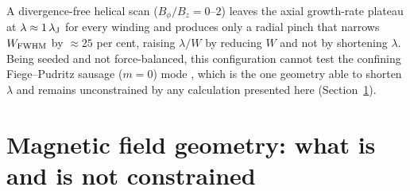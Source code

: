 \documentclass[usenatbib,twoside,twocolumn]{mnras}
\begin{document}
A divergence-free helical scan ($B_\phi/B_z=0$--$2$) leaves the axial growth-rate plateau at $\lambda\approx1\,\lambda_{\rm J}$ for every winding and produces only a radial pinch that narrows $W_{\rm FWHM}$ by $\approx25$ per cent, raising $\lambda/W$ by reducing $W$ and not by shortening $\lambda$. Being seeded and not force-balanced, this configuration cannot test the confining Fiege--Pudritz sausage ($m=0$) mode \citep{Fiege2000}, which is the one geometry able to shorten $\lambda$ and remains unconstrained by any calculation presented here (Section~\ref{sec:fields}).


\section{Magnetic field geometry: what is and is not constrained}
\label{sec:fields}
\end{document}
